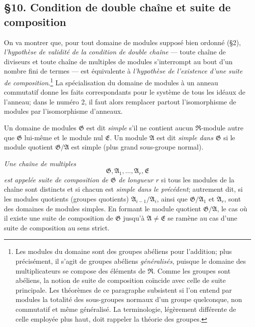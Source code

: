 \providecommand{\mR}{\mathfrak{R}}
\providecommand{\mA}{\mathfrak{A}}
\providecommand{\mB}{\mathfrak{B}}
\providecommand{\mE}{\mathfrak{E}}
\providecommand{\mG}{\mathfrak{G}}
\providecommand{\mH}{\mathfrak{H}}
\providecommand{\mM}{\mathfrak{M}}
\providecommand{\mU}{\mathfrak{U}}
\providecommand{\mC}{\mathfrak{C}}

\subsection*{\S{}10. Condition de double chaîne et suite de composition}

On va montrer que, pour tout domaine de modules supposé bien ordonné (\S{}2), \emph{l'hypothèse de validité de la condition de double chaîne} --- toute chaîne de diviseurs et toute chaîne de multiples de modules s'interrompt au bout d'un nombre fini de termes --- est équivalente à \emph{l'hypothèse de l'existence d'une suite de composition}.\footnote{Les modules du domaine sont des groupes abéliens pour l'addition; plus précisément, il s'agit de groupes abéliens \emph{généralisés}, puisque le domaine des multiplicateurs se compose des éléments de $\mR$. Comme les groupes sont abéliens, la notion de suite de composition coïncide avec celle de suite principale. Les théorèmes de ce paragraphe subsistent si l'on entend par \og{}modules\fg{} la totalité des sous-groupes normaux d'un groupe quelconque, non commutatif et même généralisé. La terminologie, légèrement différente de celle employée plus haut, doit rappeler la théorie des groupes.} La spécialisation du domaine de modules à un anneau commutatif donne les faits correspondants pour le système de tous les idéaux de l'anneau; dans le numéro 2, il faut alors remplacer partout l'isomorphisme de modules par l'isomorphisme d'anneaux.

Un domaine de modules $\mG$ est dit \emph{simple} s'il ne contient aucun $\mR$-module autre que $\mG$ lui-même et le module nul $\mE$. Un module $\mA$ est dit \emph{simple dans $\mG$} si le module quotient $\mG/\mA$ est simple (plus grand sous-groupe normal).

\emph{Une chaîne de multiples}
\[
        \mG,\mA_1,\ldots,\mA_r,\mE
\]
\emph{est appelée suite de composition de $\mG$ de longueur $r$} si tous les modules de la chaîne sont distincts et si chacun est \emph{simple dans le précédent}; autrement dit, si les modules quotients (groupes quotients) $\mA_{i-1}/\mA_i$, ainsi que $\mG/\mA_1$ et $\mA_r$, sont des domaines de modules simples. En formant le module quotient $\mG/\mA$, le cas où il existe une suite de composition de $\mG$ jusqu'à $\mA\ne\mE$ se ramène au cas d'une suite de composition au sens strict.

